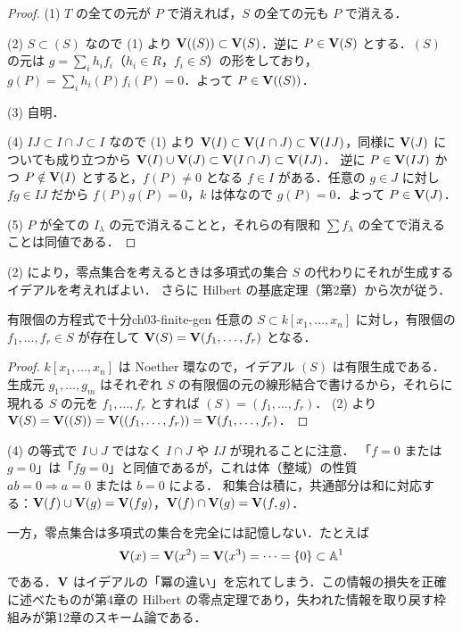 \begin{proof}
(1) $T$ の全ての元が $P$ で消えれば，$S$ の全ての元も $P$ で消える．

(2) $S\subset(S)$ なので (1) より $\mathbf{V}((S))\subset\mathbf{V}(S)$．逆に $P\in\mathbf{V}(S)$ とする．$(S)$ の元は $g=\sum_i h_if_i$（$h_i\in R$，$f_i\in S$）の形をしており，$g(P)=\sum_i h_i(P)f_i(P)=0$．よって $P\in\mathbf{V}((S))$．

(3) 自明．

(4) $IJ\subset I\cap J\subset I$ なので (1) より $\mathbf{V}(I)\subset\mathbf{V}(I\cap J)\subset\mathbf{V}(IJ)$，同様に $\mathbf{V}(J)$ についても成り立つから
$\mathbf{V}(I)\cup\mathbf{V}(J)\subset\mathbf{V}(I\cap J)\subset\mathbf{V}(IJ)$．
逆に $P\in\mathbf{V}(IJ)$ かつ $P\notin\mathbf{V}(I)$ とすると，$f(P)\ne0$ となる $f\in I$ がある．任意の $g\in J$ に対し $fg\in IJ$ だから $f(P)g(P)=0$，$k$ は体なので $g(P)=0$．よって $P\in\mathbf{V}(J)$．

(5) $P$ が全ての $I_\lambda$ の元で消えることと，それらの有限和 $\sum f_\lambda$ の全てで消えることは同値である．
\end{proof}

(2) により，零点集合を考えるときは多項式の集合 $S$ の代わりにそれが生成するイデアルを考えればよい．
さらに Hilbert の基底定理（第2章）から次が従う．

\begin{myprop}{有限個の方程式で十分}{ch03-finite-gen}
任意の $S\subset k[x_1,\dots,x_n]$ に対し，有限個の $f_1,\dots,f_r\in S$ が存在して $\mathbf{V}(S)=\mathbf{V}(f_1,\dots,f_r)$ となる．
\end{myprop}

\begin{proof}
$k[x_1,\dots,x_n]$ は Noether 環なので，イデアル $(S)$ は有限生成である．
生成元 $g_1,\dots,g_m$ はそれぞれ $S$ の有限個の元の線形結合で書けるから，それらに現れる $S$ の元を $f_1,\dots,f_r$ とすれば $(S)=(f_1,\dots,f_r)$．
(2) より $\mathbf{V}(S)=\mathbf{V}((S))=\mathbf{V}((f_1,\dots,f_r))=\mathbf{V}(f_1,\dots,f_r)$．
\end{proof}

\begin{note}
(4) の等式で $I\cup J$ ではなく $I\cap J$ や $IJ$ が現れることに注意．
「$f=0$ または $g=0$」は「$fg=0$」と同値であるが，これは体（整域）の性質 $ab=0\Rightarrow a=0\text{ または }b=0$ による．
和集合は積に，共通部分は和に対応する：$\mathbf{V}(f)\cup\mathbf{V}(g)=\mathbf{V}(fg)$，$\mathbf{V}(f)\cap\mathbf{V}(g)=\mathbf{V}(f,g)$．
\end{note}

一方，零点集合は多項式の集合を完全には記憶しない．たとえば
\[
  \mathbf{V}(x)=\mathbf{V}(x^2)=\mathbf{V}(x^3)=\cdots=\{0\}\subset\mathbb{A}^1
\]
である．$\mathbf{V}$ はイデアルの「冪の違い」を忘れてしまう．この情報の損失を正確に述べたものが第4章の Hilbert の零点定理であり，失われた情報を取り戻す枠組みが第12章のスキーム論である．

